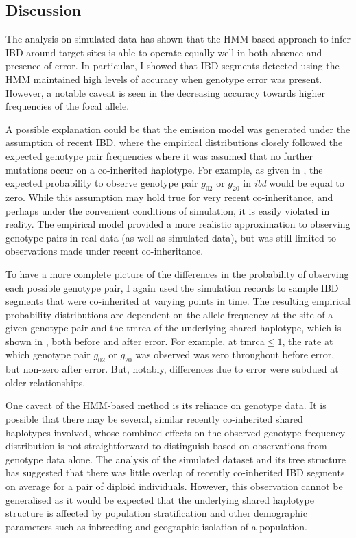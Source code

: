 %
\subsection{Discussion}
%

The analysis on simulated data has shown that the HMM-based approach to infer IBD around target sites is able to operate equally well in both absence and presence of error.
In particular, I showed that IBD segments detected using the HMM maintained high levels of accuracy when genotype error was present.
However, a notable caveat is seen in the decreasing accuracy towards higher frequencies of the focal allele.

A possible explanation could be that the emission model was generated under the assumption of recent IBD, where the empirical distributions closely followed the expected genotype pair frequencies where it was assumed that no further mutations occur on a co-inherited haplotype.
For example, as given in , the expected probability to observe genotype pair $g_{02}$ or $g_{20}$ in \emph{ibd} would be equal to zero.
While this assumption may hold true for very recent co-inheritance, and perhaps under the convenient conditions of simulation, it is easily violated in reality.
The empirical model provided a more realistic approximation to observing genotype pairs in real data (as well as simulated data), but was still limited to observations made under recent co-inheritance.

To have a more complete picture of the differences in the probability of observing each possible genotype pair, I again used the simulation records to sample IBD segments that were co-inherited at varying points in time.
The resulting empirical probability distributions are dependent on the allele frequency at the site of a given genotype pair and the \gls{tmrca} of the underlying shared haplotype, which is shown in , both before and after error.
For example, at \gls{tmrca}$\leq1$, the rate at which genotype pair $g_{02}$ or $g_{20}$ was observed was zero throughout before error, but non-zero after error.
But, notably, differences due to error were subdued at older relationships.

%

%


One caveat of the HMM-based method is its reliance on genotype data.
It is possible that there may be several, similar recently co-inherited shared haplotypes involved, whose combined effects on the observed genotype frequency distribution is not straightforward to distinguish based on observations from genotype data alone.
The analysis of the simulated dataset and its tree structure has suggested that there was little overlap of recently co-inherited IBD segments on average for a pair of diploid individuals.
However, this observation cannot be generalised as it would be expected that the underlying shared haplotype structure is affected by population stratification and other demographic parameters such as inbreeding and geographic isolation of a population.


